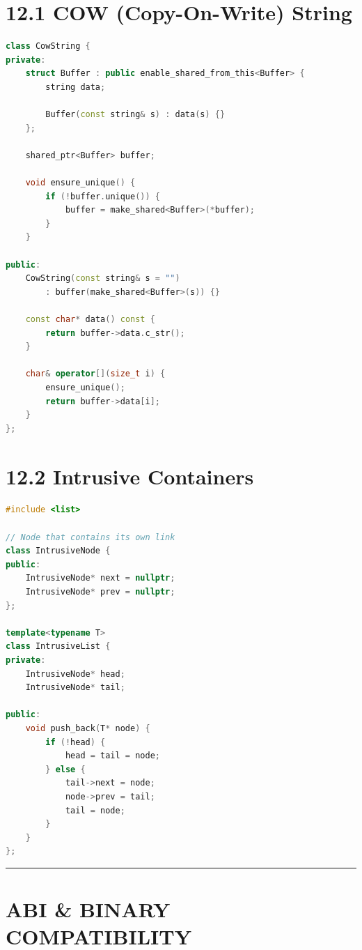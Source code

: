 \hypertarget{cow-copy-on-write-string}{%
\section{12.1 COW (Copy-On-Write)
String}\label{cow-copy-on-write-string}}

\begin{lstlisting}[language={C++}]
class CowString {
private:
    struct Buffer : public enable_shared_from_this<Buffer> {
        string data;
        
        Buffer(const string& s) : data(s) {}
    };
    
    shared_ptr<Buffer> buffer;
    
    void ensure_unique() {
        if (!buffer.unique()) {
            buffer = make_shared<Buffer>(*buffer);
        }
    }
    
public:
    CowString(const string& s = "")
        : buffer(make_shared<Buffer>(s)) {}
    
    const char* data() const {
        return buffer->data.c_str();
    }
    
    char& operator[](size_t i) {
        ensure_unique();
        return buffer->data[i];
    }
};
\end{lstlisting}

\hypertarget{intrusive-containers}{%
\section{12.2 Intrusive Containers}\label{intrusive-containers}}

\begin{lstlisting}[language={C++}]
#include <list>

// Node that contains its own link
class IntrusiveNode {
public:
    IntrusiveNode* next = nullptr;
    IntrusiveNode* prev = nullptr;
};

template<typename T>
class IntrusiveList {
private:
    IntrusiveNode* head;
    IntrusiveNode* tail;
    
public:
    void push_back(T* node) {
        if (!head) {
            head = tail = node;
        } else {
            tail->next = node;
            node->prev = tail;
            tail = node;
        }
    }
};
\end{lstlisting}

\begin{center}\rule{0.5\linewidth}{0.5pt}\end{center}

\hypertarget{abi-binary-compatibility}{%
\section{ABI \& BINARY COMPATIBILITY}\label{abi-binary-compatibility}}

